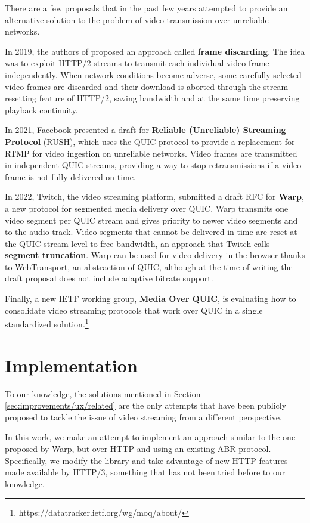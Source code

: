 There are a few proposals that in the past few years attempted to provide an alternative solution to the problem of video transmission over unreliable networks.

In 2019, the authors of \cite{framediscarding} proposed an approach called \textbf{frame discarding}. The idea was to exploit HTTP/2 streams to transmit each individual video frame independently. When network conditions become adverse, some carefully selected video frames are discarded and their download is aborted through the stream resetting feature of HTTP/2, saving bandwidth and at the same time preserving playback continuity.

In 2021, Facebook presented a draft for \textbf{Reliable (Unreliable) Streaming Protocol} (RUSH), which uses the QUIC protocol to provide a replacement for RTMP for video ingestion on unreliable networks. Video frames are transmitted in independent QUIC streams, providing a way to stop retransmissions if a video frame is not fully delivered on time.\cite{rush}

In 2022, Twitch, the video streaming platform, submitted a draft RFC for \textbf{Warp}, a new protocol for segmented media delivery over QUIC. Warp transmits one video segment per QUIC stream and gives priority to newer video segments and to the audio track. Video segments that cannot be delivered in time are reset at the QUIC stream level to free bandwidth, an approach that Twitch calls \textbf{segment truncation}. Warp can be used for video delivery in the browser thanks to WebTransport, an abstraction of QUIC, although at the time of writing the draft proposal does not include adaptive bitrate support.\cite{warp}

Finally, a new IETF working group, \textbf{Media Over QUIC}, is evaluating how to consolidate video streaming protocols that work over QUIC in a single standardized solution.\footnote{https://datatracker.ietf.org/wg/moq/about/}

\section{Implementation}
\label{sec:improvements/impl}

To our knowledge, the solutions mentioned in Section \ref{sec:improvements/ux/related} are the only attempts that have been publicly proposed to tackle the issue of video streaming from a different perspective.

In this work, we make an attempt to implement an approach similar to the one proposed by Warp, but over HTTP and using an existing ABR protocol. Specifically, we modify the \hlsjs{} library and take advantage of new HTTP features made available by HTTP/3, something that has not been tried before to our knowledge.

